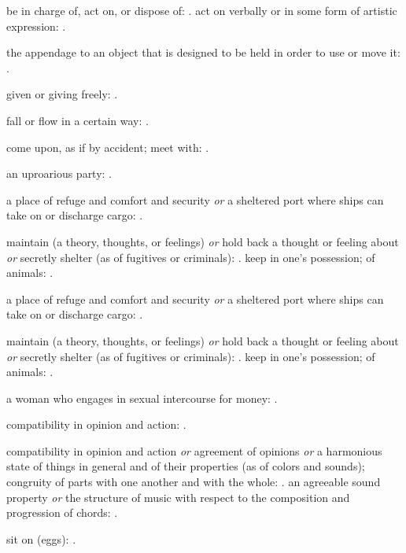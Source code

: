   be in charge of, act on, or dispose of: . act on verbally or in some form of artistic expression: .

  the appendage to an object that is designed to be held in order to use or move it: .

  given or giving freely: .

  fall or flow in a certain way: .

  come upon, as if by accident; meet with: .

  an uproarious party: .

  a place of refuge and comfort and security \textit{or} a sheltered port where ships can take on or discharge cargo: .

  maintain (a theory, thoughts, or feelings) \textit{or} hold back a thought or feeling about \textit{or} secretly shelter (as of fugitives or criminals): . keep in one's possession; of animals: .

  a place of refuge and comfort and security \textit{or} a sheltered port where ships can take on or discharge cargo: .

  maintain (a theory, thoughts, or feelings) \textit{or} hold back a thought or feeling about \textit{or} secretly shelter (as of fugitives or criminals): . keep in one's possession; of animals: .

  a woman who engages in sexual intercourse for money: .

  compatibility in opinion and action: .

  compatibility in opinion and action \textit{or} agreement of opinions \textit{or} a harmonious state of things in general and of their properties (as of colors and sounds); congruity of parts with one another and with the whole: . an agreeable sound property \textit{or} the structure of music with respect to the composition and progression of chords: .

  sit on (eggs): .

